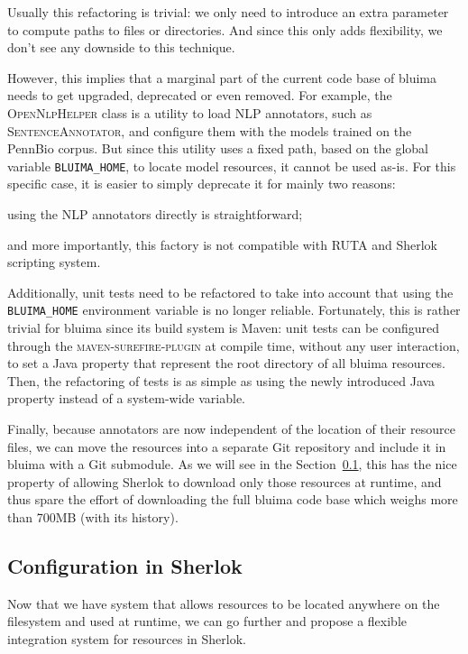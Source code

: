 \documentclass{article}
\newcommand{\ID}[1]{{\textsc{#1}}}
\newcommand{\VAR}[1]{\mbox{\texttt{#1}}}
\begin{document}
Usually this refactoring is trivial: we only need to introduce an extra parameter to compute paths
to files or directories. And since this only adds flexibility, we don't see any downside to this
technique.

However, this implies that a marginal part of the current code base of bluima needs to get upgraded,
deprecated or even removed. For example, the \ID{OpenNlp\-Helper} class is a utility to load NLP
annotators, such as \ID{Sentence\-Annotator}, and configure them with the models trained on the
PennBio corpus. But since this utility uses a fixed path, based on the global variable
\VAR{BLUIMA\_HOME}, to locate model resources, it cannot be used as-is. For this specific case, it
is easier to simply deprecate it for mainly two reasons:
\begin{enumerate*}[label=\itshape\alph*\upshape)]
    \item using the NLP annotators directly is straightforward;
    \item and more importantly, this factory is not compatible with RUTA and Sherlok scripting system.
\end{enumerate*}

Additionally, unit tests need to be refactored to take into account that using the
\VAR{BLUIMA\_HOME} environment variable is no longer reliable. Fortunately, this is rather trivial
for bluima since its build system is Maven: unit tests can be configured through the
\ID{maven-surefire-plugin} at compile time, without any user interaction, to set a Java property
that represent the root directory of all bluima resources. Then, the refactoring of tests is as
simple as using the newly introduced Java property instead of a system-wide variable.

Finally, because annotators are now independent of the location of their resource files, we can move
the resources into a separate Git repository and include it in bluima with a Git submodule. As we
will see in the Section~\ref{sec:config_in_sherlok}, this has the nice property of allowing Sherlok
to download only those resources at runtime, and thus spare the effort of downloading the full
bluima code base which weighs more than 700MB (with its history).

\subsection{Configuration in Sherlok}
\label{sec:config_in_sherlok}

Now that we have system that allows resources to be located anywhere on the filesystem and used at
runtime, we can go further and propose a flexible integration system for resources in Sherlok.
\end{document}

